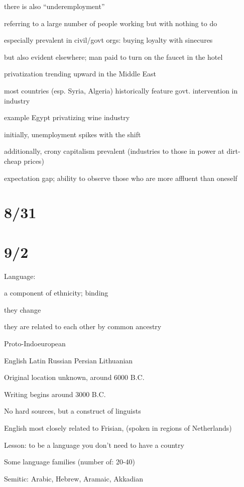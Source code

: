 \documentclass[12pt]{article}
\begin{document}
\noindent
there is also ``underemployment''

referring to a large number of people working but with nothing to do

especially prevalent in civil/govt orgs: buying loyalty with sinecures

but also evident elsewhere; man paid to turn on the faucet in the hotel

\noindent
privatization trending upward in the Middle East

most countries (esp. Syria, Algeria) historically feature govt. intervention in industry

example Egypt privatizing wine industry

initially, unemployment spikes with the shift

additionally, crony capitalism prevalent (industries to those in power at dirt-cheap prices)

expectation gap; ability to observe those who are more affluent than oneself

\section{8/31}



\section{9/2}

Language:

a component of ethnicity; binding

they change

they are related to each other by common ancestry

\noindent
Proto-Indoeuropean

English Latin Russian Persian Lithuanian

Original location unknown, around 6000 B.C.

Writing begins around 3000 B.C.

No hard sources, but a construct of linguists

\noindent
English most closely related to Frisian, (spoken in regions of Netherlands)

Lesson: to be a language you don't need to have a country

\noindent
Some language families (number of: 20-40)

Semitic: Arabic, Hebrew, Aramaic, Akkadian
\end{document}
